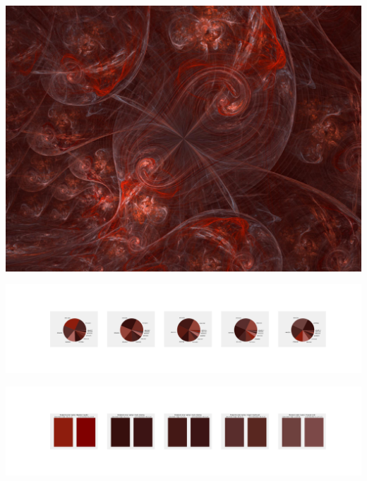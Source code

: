 \documentclass[11pt]{article}
\begin{document}
\begin{landscape}
    \begin{center}
    \includegraphics[width=\textwidth]{./nbimg/file (203).jpg}
    \end{center}

    \begin{center}
    \includegraphics[width=250mm]{./nbimg/pie-116.jpg}
    \end{center}

    \begin{center}
    \includegraphics[width=250mm]{./nbimg/peak-116.jpg}
    \end{center}
    


\end{landscape}
\end{document}
